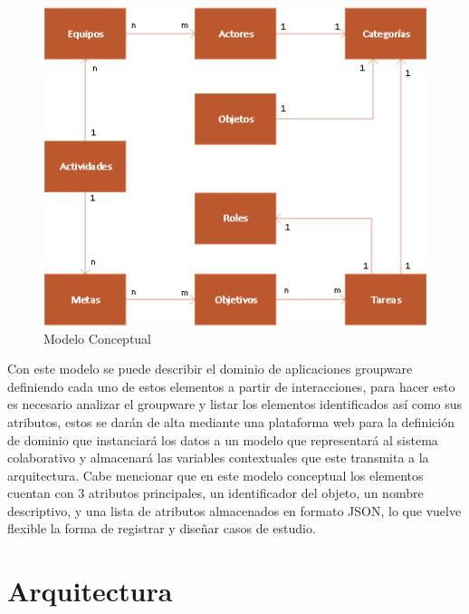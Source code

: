 \begin{figure}[h!]
  \centering
    \includegraphics[scale=0.7]{images/MERMetamodel}
  \caption{Modelo Conceptual \cite{montane2013context}}
  \label{cmp:mmc}
\end{figure}


Con este modelo se puede describir el dominio de aplicaciones groupware definiendo cada uno de estos elementos a partir de interacciones, para hacer esto es necesario analizar el groupware y listar los elementos identificados as\'i como sus atributos, estos se 
dar\'an de alta mediante una plataforma web para la definici\'on de dominio que instanciar\'a los datos a un modelo que representar\'a al sistema colaborativo y almacenar\'a las variables contextuales que este transmita a la arquitectura. Cabe mencionar que en este modelo conceptual los elementos cuentan con 3 atributos principales, un identificador del objeto, un nombre descriptivo, y una lista de atributos almacenados en formato JSON, lo que vuelve flexible la forma de registrar y dise\~nar casos de estudio.

\section{Arquitectura}

